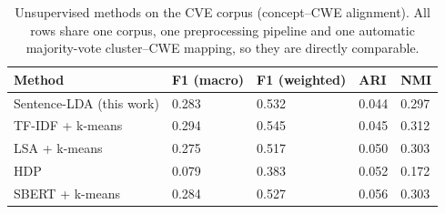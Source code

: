 \begin{table}
\caption{Unsupervised methods on the CVE corpus (concept--CWE alignment). All rows share one corpus, one preprocessing pipeline and one automatic majority-vote cluster--CWE mapping, so they are directly comparable.}
\label{tab:baselines}
\begin{tabular}{lllll}
\toprule
Method & F1 (macro) & F1 (weighted) & ARI & NMI \\
\midrule
Sentence-LDA (this work) & 0.283 & 0.532 & 0.044 & 0.297 \\
TF-IDF + k-means & 0.294 & 0.545 & 0.045 & 0.312 \\
LSA + k-means & 0.275 & 0.517 & 0.050 & 0.303 \\
HDP & 0.079 & 0.383 & 0.052 & 0.172 \\
SBERT + k-means & 0.284 & 0.527 & 0.056 & 0.303 \\
\bottomrule
\end{tabular}
\end{table}
